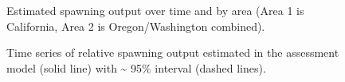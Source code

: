 \documentclass[
]{scrartcl}
\begin{document}
\begin{figure}


\caption{\label{fig-spout_area}Estimated spawning output over time and
by area (Area 1 is California, Area 2 is Oregon/Washington combined).}

\end{figure}%

\begin{figure}


\caption{\label{fig-status_combined}Time series of relative spawning
output estimated in the assessment model (solid line) with
\textasciitilde{} 95\% interval (dashed lines).}

\end{figure}%
\end{document}
